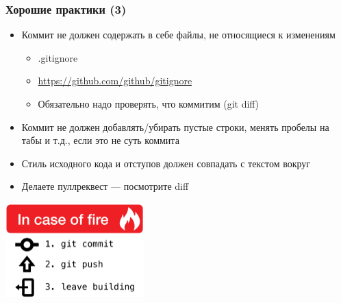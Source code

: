 \documentclass{../slides-style}
\begin{document}
    \begin{frame}
        \frametitle{Хорошие практики (3)}
        \begin{itemize}
            \item Коммит не должен содержать в себе файлы, не относящиеся к изменениям
            \begin{itemize}
                \item .gitignore
                \item \url{https://github.com/github/gitignore}
                \item Обязательно надо проверять, что коммитим (git diff)
            \end{itemize}
            \item Коммит не должен добавлять/убирать пустые строки, менять пробелы на табы и т.д., если это не суть коммита
            \item Стиль исходного кода и отступов должен совпадать с текстом вокруг
            \item Делаете пуллреквест --- посмотрите diff
        \end{itemize}
        \begin{center}
            \includegraphics[width=0.4\textwidth]{inCaseOfFire.png}
        \end{center}
    \end{frame}
\end{document}
